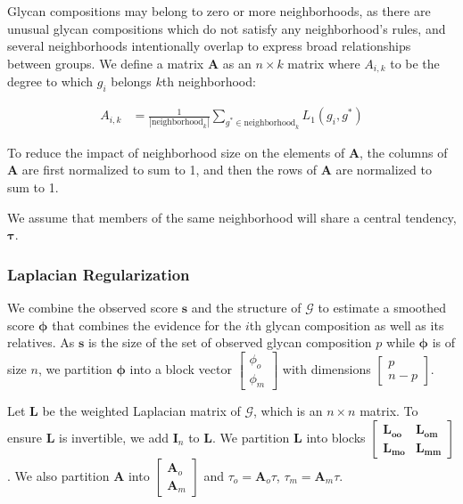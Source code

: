         Glycan compositions may belong to zero or more neighborhoods,
        as there are unusual glycan compositions which do not satisfy
        any neighborhood's rules, and several neighborhoods intentionally
        overlap to express broad relationships between groups. We define
        a matrix $\mathbf{A}$ as an $n \times k$ matrix where $A_{i, k}$
        to be the degree to which $g_i$ belongs $k$th neighborhood:

        \begin{align}
            A_{i, k} &= \frac{1}{|\text{neighborhood}_k|}\sum_{
                g^* \in \text{neighborhood}_k}{L_1(g_i, g^*)}
        \end{align}

        To reduce the impact of neighborhood size on the elements
        of $\mathbf{A}$, the columns of $\mathbf{A}$ are first
        normalized to sum to 1, and then the rows of $\mathbf{A}$
        are normalized to sum to 1.

        We assume that members of the same neighborhood will
        share a central tendency, $\mathbf{\tau}$.

    \subsubsection{Laplacian Regularization}
        We combine the observed score $\mathbf{s}$ and the structure
        of $\mathcal{G}$ to estimate a smoothed score $\mathbf{\phi}$
        that combines the evidence for the $i$th glycan composition
        as well as its relatives. As $\mathbf{s}$ is the size of the
        set of observed glycan composition $p$ while $\mathbf{\phi}$
        is of size $n$, we partition $\mathbf{\phi}$ into a block
        vector $\begin{bmatrix}\phi_o\\ \phi_m\end{bmatrix}$ with
        dimensions $\begin{bmatrix}p\\ n-p\end{bmatrix}$.

        Let $\mathbf{L}$ be the weighted Laplacian matrix of $\mathcal{G}$,
        which is an $n \times n$ matrix. To ensure $\mathbf{L}$ is
        invertible, we add $\mathbf{I}_n$ to $\mathbf{L}$. We partition
        $\mathbf{L}$ into blocks $\begin{bmatrix} \mathbf{L_{oo}} &
        \mathbf{L_{om}} \\ \mathbf{L_{mo}} & \mathbf{L_{mm}}\end{bmatrix}$.
        We also partition $\mathbf{A}$ into $\begin{bmatrix}\mathbf{A}_o\\
        \mathbf{A}_m\end{bmatrix}$ and $\tau_o = \mathbf{A}_o\tau$,
        $\tau_m = \mathbf{A}_m\tau$.

